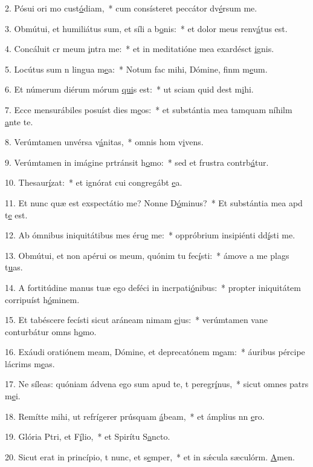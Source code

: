 2. Pósui ori mo cust\uline{ó}diam,~* cum consísteret peccátor dv\uline{é}rsum me.\par 
3. Obmútui, et humiliátus sum, et síli a b\uline{o}nis:~* et dolor meus renv\uline{á}tus est.\par 
4. Concáluit cr meum \uline{i}ntra me:~* et in meditatióne mea exardésct \uline{i}gnis.\par 
5. Locútus sum n lingua m\uline{e}a:~* Notum fac mihi, Dómine, finm m\uline{e}um.\par 
6. Et númerum diérum mórum \uline{qui}s est:~* ut sciam quid dest m\uline{i}hi.\par 
7. Ecce mensurábiles posuíst dies m\uline{e}os:~* et substántia mea tamquam níhilm \uline{a}nte te.\par 
8. Verúmtamen unvérsa v\uline{á}nitas,~* omnis hom v\uline{i}vens.\par 
9. Verúmtamen in imágine prtránsit h\uline{o}mo:~* sed et frustra contrb\uline{á}tur.\par 
10. Thesaur\uline{í}zat:~* et ignórat cui congregábt \uline{e}a.\par 
11. Et nunc quæ est exspectátio me? Nonne D\uline{ó}minus?~* Et substántia mea apd t\uline{e} est.\par 
12. Ab ómnibus iniquitátibus mes éru\uline{e} me:~* oppróbrium insipiénti dd\uline{í}sti me.\par 
13. Obmútui, et non apérui os meum, quónim tu fec\uline{í}sti:~* ámove a me plags t\uline{u}as.\par 
14. A fortitúdine manus tuæ ego deféci in incrpati\uline{ó}nibus:~* propter iniquitátem corripuíst h\uline{ó}minem.\par 
15. Et tabéscere fecísti sicut aráneam nimam \uline{e}jus:~* verúmtamen vane conturbátur omns h\uline{o}mo.\par 
16. Exáudi oratiónem meam, Dómine, et deprecatónem m\uline{e}am:~* áuribus pércipe lácrims m\uline{e}as.\par 
17. Ne síleas: quóniam ádvena ego sum apud te, t peregr\uline{í}nus,~* sicut omnes patrs m\uline{e}i.\par 
18. Remítte mihi, ut refrígerer prúsquam \uline{á}beam,~* et ámplius nn \uline{e}ro.\par 
19. Glória Ptri, et F\uline{í}lio,~* et Spirítu S\uline{a}ncto.\par 
20. Sicut erat in princípio, t nunc, et s\uline{e}mper,~* et in sǽcula sæculórm. \uline{A}men.\par 
